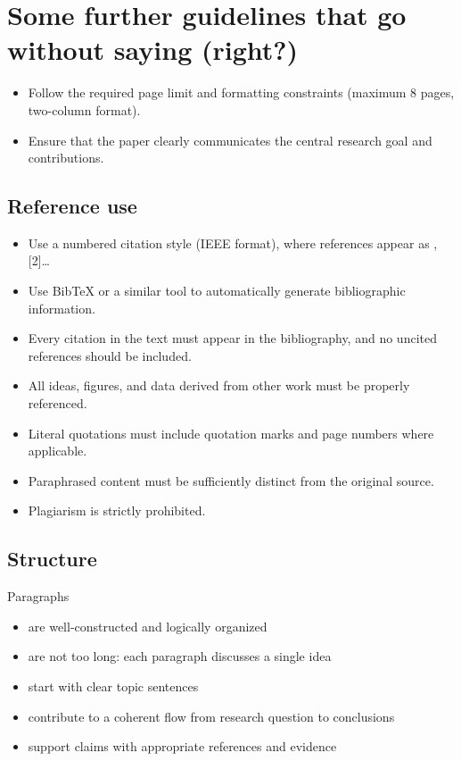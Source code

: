 \appendix
\section{Some further guidelines that go without saying (right?)}
\label{sec:appendix}

\begin{itemize}
  \item Follow the required page limit and formatting constraints (maximum 8 pages, two-column format).
  \item Ensure that the paper clearly communicates the central research goal and contributions.
\end{itemize}

\subsection{Reference use}
\begin{itemize}
  \item Use a numbered citation style (IEEE format), where references appear as \cite{example}, [2]\ldots
  \item Use BibTeX or a similar tool to automatically generate bibliographic information.
  \item Every citation in the text must appear in the bibliography, and no uncited references should be included.
  \item All ideas, figures, and data derived from other work must be properly referenced.
  \item Literal quotations must include quotation marks and page numbers where applicable.
  \item Paraphrased content must be sufficiently distinct from the original source.
  \item Plagiarism is strictly prohibited.
\end{itemize}

\subsection{Structure}
Paragraphs
\begin{itemize}
  \item are well-constructed and logically organized
  \item are not too long: each paragraph discusses a single idea
  \item start with clear topic sentences
  \item contribute to a coherent flow from research question to conclusions
  \item support claims with appropriate references and evidence
\end{itemize}

